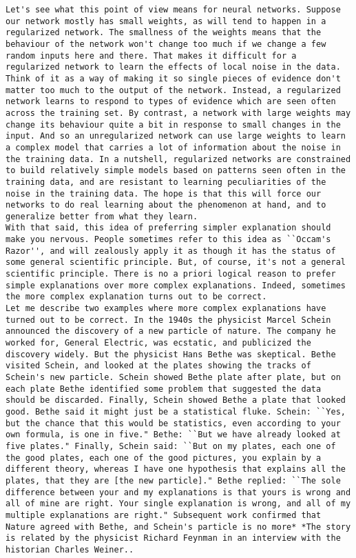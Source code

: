\begin{lstlisting}
Let's see what this point of view means for neural networks. Suppose our network mostly has small weights, as will tend to happen in a regularized network. The smallness of the weights means that the behaviour of the network won't change too much if we change a few random inputs here and there. That makes it difficult for a regularized network to learn the effects of local noise in the data. Think of it as a way of making it so single pieces of evidence don't matter too much to the output of the network. Instead, a regularized network learns to respond to types of evidence which are seen often across the training set. By contrast, a network with large weights may change its behaviour quite a bit in response to small changes in the input. And so an unregularized network can use large weights to learn a complex model that carries a lot of information about the noise in the training data. In a nutshell, regularized networks are constrained to build relatively simple models based on patterns seen often in the training data, and are resistant to learning peculiarities of the noise in the training data. The hope is that this will force our networks to do real learning about the phenomenon at hand, and to generalize better from what they learn.
With that said, this idea of preferring simpler explanation should make you nervous. People sometimes refer to this idea as ``Occam's Razor'', and will zealously apply it as though it has the status of some general scientific principle. But, of course, it's not a general scientific principle. There is no a priori logical reason to prefer simple explanations over more complex explanations. Indeed, sometimes the more complex explanation turns out to be correct.
Let me describe two examples where more complex explanations have turned out to be correct. In the 1940s the physicist Marcel Schein announced the discovery of a new particle of nature. The company he worked for, General Electric, was ecstatic, and publicized the discovery widely. But the physicist Hans Bethe was skeptical. Bethe visited Schein, and looked at the plates showing the tracks of Schein's new particle. Schein showed Bethe plate after plate, but on each plate Bethe identified some problem that suggested the data should be discarded. Finally, Schein showed Bethe a plate that looked good. Bethe said it might just be a statistical fluke. Schein: ``Yes, but the chance that this would be statistics, even according to your own formula, is one in five." Bethe: ``But we have already looked at five plates." Finally, Schein said: ``But on my plates, each one of the good plates, each one of the good pictures, you explain by a different theory, whereas I have one hypothesis that explains all the plates, that they are [the new particle]." Bethe replied: ``The sole difference between your and my explanations is that yours is wrong and all of mine are right. Your single explanation is wrong, and all of my multiple explanations are right." Subsequent work confirmed that Nature agreed with Bethe, and Schein's particle is no more* *The story is related by the physicist Richard Feynman in an interview with the historian Charles Weiner..

\end{lstlisting}
